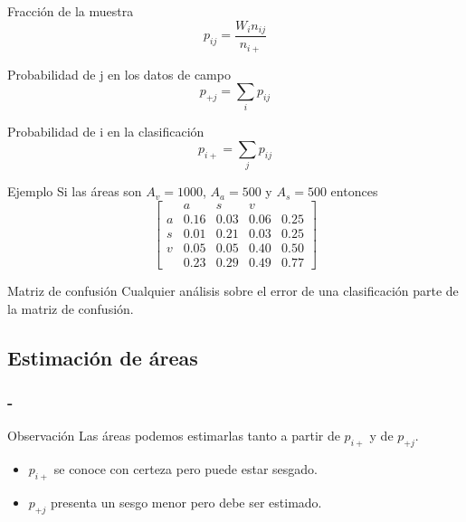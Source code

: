 \documentclass[]{beamer}
\begin{document}
\begin{frame}{\subsecname}
  \begin{block}{Fracción de la muestra}
      $$p_{ij} = \frac{W_i n_{ij}}{n_{i+}}$$
  \end{block}\pause
  \begin{block}{Probabilidad de j en los datos de campo}
    $$p_{+j} = \sum_i p_{ij}$$
  \end{block}
  \begin{block}{Probabilidad de i en la clasificación}
    $$p_{i+} = \sum_j p_{ij}$$
  \end{block}
\end{frame}

\begin{frame}{\subsecname}
  \begin{exampleblock}{Ejemplo}
      Si las áreas son $A_v = 1000$, $A_a = 500$ y $A_s = 500$ entonces \pause
    \[
    \begin{bmatrix}
          & a   & s        & v    & \\
        a & 0.16  & 0.03   & 0.06 & 0.25 \\
        s & 0.01  & 0.21   & 0.03 & 0.25 \\
        v & 0.05  & 0.05   & 0.40 & 0.50 \\
          & 0.23  & 0.29   & 0.49 & 0.77
    \end{bmatrix} \]
  \end{exampleblock}
\end{frame}

\begin{frame}{\subsecname}
  \begin{block}{Matriz de confusión}
    Cualquier análisis sobre el error de una clasificación parte de la matriz de confusión.
  \end{block}
\end{frame}

\subsection{Estimación de áreas}

\begin{frame}
    \frametitle{\secname-\subsecname}
    \begin{block}{Observación}
        Las áreas podemos estimarlas tanto a partir de $p_{i+}$ y de
        $p_{+j}$.\pause
        \begin{itemize}
            \item $p_{i+}$ se conoce con certeza pero puede estar sesgado.
            \item $p_{+j}$ presenta un sesgo menor pero debe ser estimado.
        \end{itemize}
    \end{block}
\end{frame}
\end{document}
